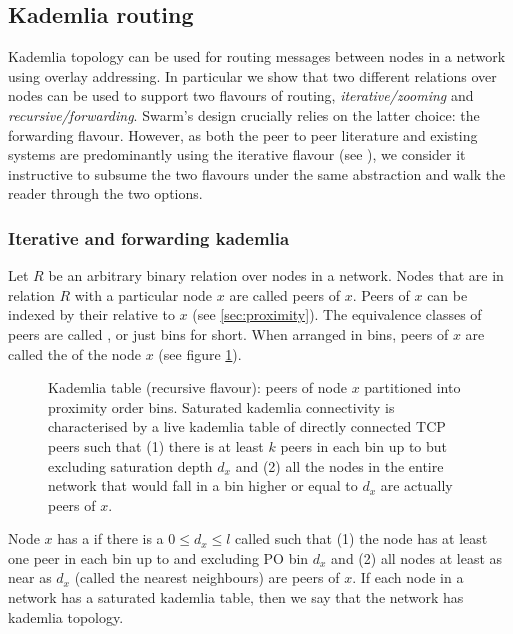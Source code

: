 \subsection{Kademlia routing}\label{sec:kademlia-routing}

Kademlia topology can be used for routing messages between nodes in a network using overlay addressing. In particular we show that two different relations over nodes can be used to support two flavours of routing, \emph{iterative/zooming} and \emph{recursive/forwarding}. Swarm's design crucially relies on the latter choice: the forwarding flavour. However, as both the peer to peer literature and existing systems are predominantly using the iterative flavour (see \cite{maymounkov2002kademlia,baumgart2007s,lua2005survey}), we consider it instructive to subsume the two flavours under the same abstraction and walk the reader through the two options.

\subsubsection{Iterative and forwarding kademlia}

Let $R$ be an arbitrary binary relation over nodes in a network. Nodes that are in relation $R$ with a particular node $x$ are called peers of $x$. Peers of $x$ can be indexed by their  relative to $x$ (see \ref{sec:proximity}).
The equivalence classes of peers are called , or just bins for short. When arranged in bins, peers of $x$ are called the  of the node $x$ (see figure \ref{fig:kademliatable}). 


\begin{figure}[htbp]
   \centering
   \caption{Kademlia table (recursive flavour):  peers of node $x$ partitioned into proximity order bins. Saturated kademlia connectivity is 
   characterised by a live kademlia table of directly connected TCP peers such that (1) there is at least $k$ peers in each bin up to but excluding saturation depth $d_x$ and (2) all the nodes in the entire network that would fall in a bin higher or equal to $d_x$ are actually peers of $x$. }
   \label{fig:kademliatable}
\end{figure}


Node $x$ has a  if there is a $0\leq d_x\leq l$ called  such that (1) the node has at least one peer in each bin up to and excluding PO bin $d_x$ and (2) all nodes at least as near as $d_x$ (called the nearest neighbours) are peers of $x$. If each node in a network has a saturated kademlia table, then we say that the network has kademlia topology.

